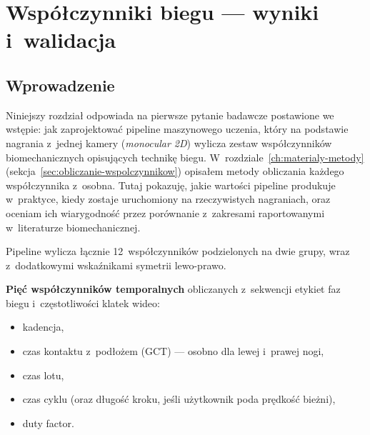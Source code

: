 %

\chapter{Współczynniki biegu --- wyniki i~walidacja}
\label{ch:wspolczynniki}

\section{Wprowadzenie}
\label{sec:wsp-wprowadzenie}

Niniejszy rozdział odpowiada na pierwsze pytanie badawcze postawione we wstępie: jak zaprojektować pipeline maszynowego uczenia, który na podstawie nagrania z~jednej kamery (\textit{monocular 2D}) wylicza zestaw współczynników biomechanicznych opisujących technikę biegu. W~rozdziale~\ref{ch:materialy-metody} (sekcja~\ref{sec:obliczanie-wspolczynnikow}) opisałem metody obliczania każdego współczynnika z~osobna. Tutaj pokazuję, jakie wartości pipeline produkuje w~praktyce, kiedy zostaje uruchomiony na rzeczywistych nagraniach, oraz oceniam ich wiarygodność przez porównanie z~zakresami raportowanymi w~literaturze biomechanicznej.

Pipeline wylicza łącznie 12~współczynników podzielonych na dwie grupy, wraz z~dodatkowymi wskaźnikami symetrii lewo-prawo.

\textbf{Pięć współczynników temporalnych} obliczanych z~sekwencji etykiet faz biegu i~częstotliwości klatek wideo:
\begin{itemize}
    \item kadencja,
    \item czas kontaktu z~podłożem (GCT) --- osobno dla lewej i~prawej nogi,
    \item czas lotu,
    \item czas cyklu (oraz długość kroku, jeśli użytkownik poda prędkość bieżni),
    \item duty factor.
\end{itemize}

